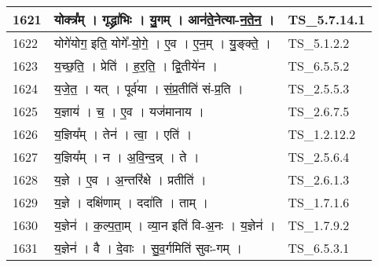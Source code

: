 \documentclass[17pt]{extarticle}
\begin{document}
\begin{longtable}{||p{0.4in}||p{4.9in}||p{0.9in}||}
    \hline
        
    1621 & योक्त्र᳚म्   ।   गृद्ध्रा॑भिः   ।   यु॒गम्   ।   आन॑ते॒नेत्या{-}न॒ते॒न॒   ।    & TS\_5.7.14.1       \\
    
    \hline
        
    1622 & योगे॑योग॒ इति॒ योगे᳚{-}यो॒गे॒   ।   ए॒व   ।   ए॒न॒म्   ।   यु॒ङ्क्ते॒   ।    & TS\_5.1.2.2       \\
    
    \hline
        
    1623 & य॒च्छ॒ति॒   ।   प्रेति॑   ।   ह॒र॒ति॒   ।   द्वि॒तीये॑न   ।    & TS\_6.5.5.2       \\
    
    \hline
        
    1624 & य॒जे॒त॒   ।   यत्   ।   पूर्व॑या   ।   सं॒प्र॒तीति॑ सं{-}प्र॒ति   ।    & TS\_2.5.5.3       \\
    
    \hline
        
    1625 & य॒ज्ञाय॑   ।   च॒   ।   ए॒व   ।   यज॑मानाय   ।    & TS\_2.6.7.5       \\
    
    \hline
        
    1626 & य॒ज्ञिय᳚म्   ।   तेन॑   ।   त्वा॒   ।   एति॑   ।    & TS\_1.2.12.2       \\
    
    \hline
        
    1627 & य॒ज्ञिय᳚म्   ।   न   ।   अ॒वि॒न्द॒न्न्   ।   ते   ।    & TS\_2.5.6.4       \\
    
    \hline
        
    1628 & य॒ज्ञे   ।   ए॒व   ।   अ॒न्तरि॑क्षे   ।   प्रतीति॑   ।    & TS\_2.6.1.3       \\
    
    \hline
        
    1629 & य॒ज्ञे   ।   दक्षि॑णाम्   ।   ददा॑ति   ।   ताम्   ।    & TS\_1.7.1.6       \\
    
    \hline
        
    1630 & य॒ज्ञेन॑   ।   क॒ल्प॒ता॒म्   ।   व्या॒न इति॑ वि{-}अ॒नः   ।   य॒ज्ञेन॑   ।    & TS\_1.7.9.2       \\
    
    \hline
        
    1631 & य॒ज्ञेन॑   ।   वै   ।   दे॒वाः   ।   सु॒व॒र्गमिति॑ सुवः{-}गम्   ।    & TS\_6.5.3.1       \\
    

\end{longtable}
\end{document}
